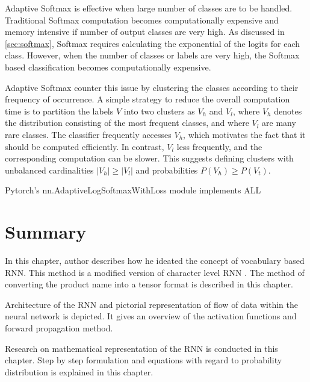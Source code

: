Adaptive Softmax \parencite{Grave.14092016} is effective when large number of classes are to be handled. Traditional Softmax computation becomes computationally expensive and memory intensive if number of output classes are very high. As discussed in  \ref{sec:softmax}, Softmax requires calculating the exponential of the logits for each class. However, when the number of classes or labels are very high, the Softmax based classification becomes computationally expensive.



Adaptive Softmax \parencite{Grave.14092016} counter this issue by clustering the classes according to their frequency of occurrence. A simple strategy to reduce the overall computation time is to partition the labels \(V\) into two clusters as \(V_h\) and \(V_l\), where \(V_h\) denotes the distribution consisting of the most frequent classes, and where \(V_l\) are many rare classes. The classifier frequently accesses \(V_h\), which motivates the fact that it should be computed efficiently. In contrast,  \(V_l\) less frequently, and the corresponding computation can be slower. This suggests defining clusters with unbalanced cardinalities \(|V_h| \geq |V_l|\) and probabilities \(P(V_h) \geq P(V_t)\).

Pytorch's \parencite{Paszke.03122019} nn.AdaptiveLogSoftmaxWithLoss module implements \acf{ALL}


\section{Summary}

In this chapter, author describes how he ideated the concept of vocabulary based RNN. This method is a modified version of character level RNN \parencite{sean}. The method of converting the product name into a tensor format is described in this chapter. 

Architecture of the RNN and pictorial representation of flow of data within the neural network is depicted. It gives an overview of the activation functions and forward propagation method. 

Research on mathematical representation of the RNN  is conducted in this chapter. Step by step formulation and equations with regard to probability distribution is explained in this chapter.